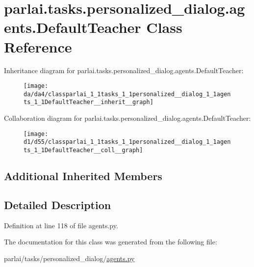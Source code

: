\hypertarget{classparlai_1_1tasks_1_1personalized__dialog_1_1agents_1_1DefaultTeacher}{}\section{parlai.\+tasks.\+personalized\+\_\+dialog.\+agents.\+Default\+Teacher Class Reference}
\label{classparlai_1_1tasks_1_1personalized__dialog_1_1agents_1_1DefaultTeacher}


Inheritance diagram for parlai.\+tasks.\+personalized\+\_\+dialog.\+agents.\+Default\+Teacher\+:\nopagebreak
\begin{figure}[H]
\begin{center}
\leavevmode
\texttt{[image: da/da4/classparlai\_1\_1tasks\_1\_1personalized\_\_dialog\_1\_1agents\_1\_1DefaultTeacher\_\_inherit\_\_graph]}
\end{center}
\end{figure}


Collaboration diagram for parlai.\+tasks.\+personalized\+\_\+dialog.\+agents.\+Default\+Teacher\+:\nopagebreak
\begin{figure}[H]
\begin{center}
\leavevmode
\texttt{[image: d1/d55/classparlai\_1\_1tasks\_1\_1personalized\_\_dialog\_1\_1agents\_1\_1DefaultTeacher\_\_coll\_\_graph]}
\end{center}
\end{figure}
\subsection*{Additional Inherited Members}


\subsection{Detailed Description}


Definition at line 118 of file agents.\+py.



The documentation for this class was generated from the following file\+:\begin{DoxyCompactItemize}
\item 
parlai/tasks/personalized\+\_\+dialog/\hyperlink{parlai_2tasks_2personalized__dialog_2agents_8py}{agents.\+py}\end{DoxyCompactItemize}
